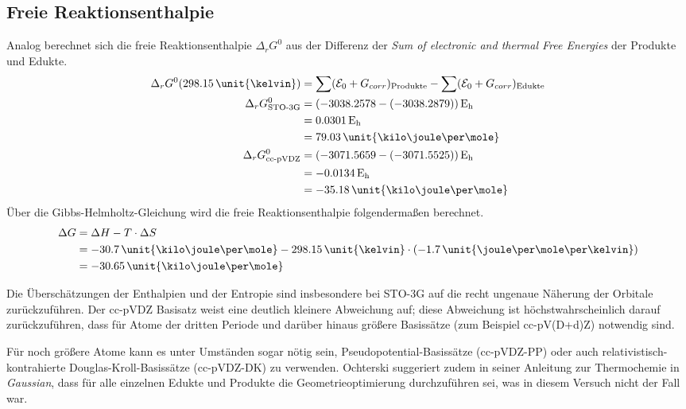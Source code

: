 \subsection{Freie Reaktionsenthalpie}

Analog berechnet sich die freie Reaktionsenthalpie $\Delta_r G^0$ aus der Differenz der \textit{Sum of electronic and thermal Free Energies} der Produkte und Edukte.
\begin{align*}
    \Delta_r G^0(298.15\, \text{\unit{\kelvin}}) &= \sum (\mathcal{E}_0 + G_{corr})_{\text{Produkte}} - \sum (\mathcal{E}_0 + G_{corr})_{\text{Edukte}} \\
     \Delta_r G^0_{\text{STO-3G}} &= (- 3038.2578 - (- 3038.2879))\, \text{E\textsubscript{h}} \\
                           &=  0.0301\, \text{E\textsubscript{h}} \\
                           &= 79.03\, \text{\unit{\kilo\joule\per\mole}} \\
    \Delta_r G^0_{\text{cc-pVDZ}} &= (- 3071.5659 - (- 3071.5525))\, \text{E\textsubscript{h}} \\
                           &= - 0.0134\, \text{E\textsubscript{h}} \\
                           &= - 35.18\, \text{\unit{\kilo\joule\per\mole}}
\end{align*}
Über die Gibbs-Helmholtz-Gleichung wird die freie Reaktionsenthalpie folgendermaßen berechnet.
\begin{align*}
    \Delta G &= \Delta H - T \cdot \Delta S \\
             &= -30.7\, \text{\unit{\kilo\joule\per\mole}} - 298.15\, \text{\unit{\kelvin}} \cdot (-1.7\, \text{\unit{\joule\per\mole\per\kelvin}}) \\
             &= -30.65\, \text{\unit{\kilo\joule\per\mole}}
\end{align*}

Die Überschätzungen der Enthalpien und der Entropie sind insbesondere bei STO-3G auf die recht ungenaue Näherung der Orbitale zurückzuführen.
Der cc-pVDZ Basisatz weist eine deutlich kleinere Abweichung auf; diese Abweichung ist höchstwahrscheinlich darauf zurückzuführen, dass für Atome der dritten Periode und darüber hinaus
größere Basissätze (zum Beispiel cc-pV(D+d)Z) notwendig sind.\autocite{al-ar:large-basis}

Für noch größere Atome kann es unter Umständen sogar nötig sein, Pseudopotential-Basissätze (cc-pVDZ-PP) oder auch re\-la\-ti\-vis\-tisch-kontrahierte Douglas-Kroll-Basissätze (cc-pVDZ-DK) zu verwenden.\autocite{ga-kr:bigger-basis}
Ochterski suggeriert zudem in seiner Anleitung zur Thermochemie in \textit{Gaussian}, dass für alle einzelnen Edukte und Produkte die Geometrieoptimierung durchzuführen sei\autocite{gaussian-thermochem},
was in diesem Versuch nicht der Fall war.

